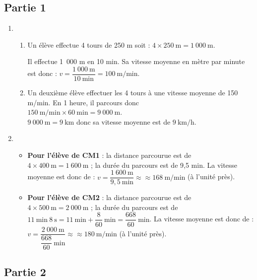 \subsection*{Partie 1}

\begin{enumerate}
	\item 
	\begin{enumerate}
		\item Un élève effectue 4 tours de 250 m soit : $4\times250~\text{m}=1~000~\text{m}$.
		
		Il effectue 1~000 m en 10 min. Sa vitesse moyenne en mètre par minute est donc : $v=\dfrac{1~000~\text{m}}{10~\text{min}}=100~\text{m/min}$.
		
		\item Un deuxième élève effectuer les 4 tours à une vitesse moyenne de 150 m/min. En 1 heure, il parcours donc\\ $150~\text{m/min} \times 60~\text{min} = 9~000~\text{m}$.\\
		$9~000~\text{m} = 9~\text{km}$ donc sa vitesse moyenne est de $9~\text{km/h}$.
		
		\end{enumerate}
		
		\item \begin{itemize}
			\item \textbf{Pour l'élève de CM1} : la distance parcourue est de $4 \times 400~\text{m} = 1~600~\text{m}$ ; la durée du parcours est de 9,5 min. La vitesse moyenne est donc de : $v = \dfrac{1~600~\text{m}}{9,5~\text{min}} \approx ≈168~\text{m/min}$⁡ (à l'unité près).
			
			\item \textbf{Pour l'élève de CM2} : la distance parcourue est de $4 \times 500~\text{m} = 2~000~\text{m}$ ; la durée du parcours est de\\ $11~\text{min}~8~\text{s} = 11~\text{min} + \dfrac{8}{60}~\text{min} = \dfrac{668}{60}~\text{min}$. La vitesse moyenne est donc de : $v = \dfrac{2~000~\text{m}}{\dfrac{668}{60}~\text{min}} \approx ≈180~\text{m/min}$⁡ (à l'unité près).
		\end{itemize}
	\end{enumerate}
	
\subsection*{Partie 2}
	
